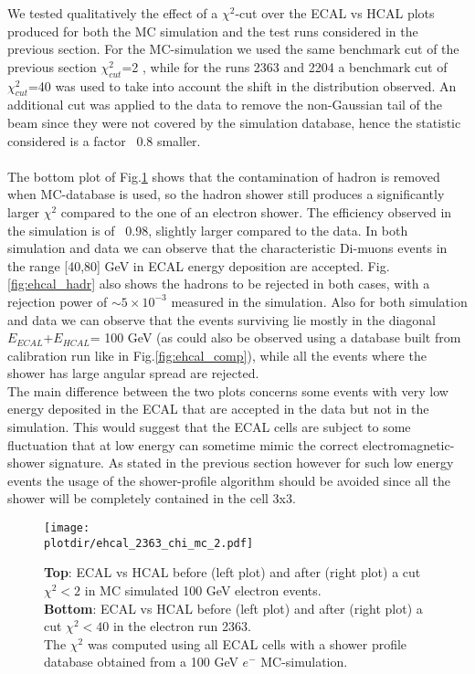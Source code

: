 We tested qualitatively the effect of a $\chi^{2}$-cut over the
ECAL vs HCAL plots produced for both the MC simulation
and the test runs considered in the previous section. For the
MC-simulation we used the same benchmark cut of the previous section
$\chi^2_{cut}$=2 , while for the runs 2363 and 2204 a benchmark cut of
$\chi^2_{cut}$=40 was used to take into account the shift in the
distribution observed. An additional cut was applied to the data to
remove the non-Gaussian tail of the beam since they were not covered
by the simulation
database, hence the statistic considered is a factor ~0.8 smaller.\\
\\
The bottom plot of Fig.\ref{fig:ehcal_elec} shows that the
contamination of hadron is removed when MC-database is used, so
the hadron shower still produces a significantly larger $\chi^{2}$
compared to the one of an electron shower. The efficiency
observed in the simulation is of ~0.98, slightly larger compared to the data. 
In both simulation and data we can observe that the characteristic
Di-muons events in the range [40,80] GeV in ECAL energy
deposition are accepted.
Fig.\ref{fig:ehcal_hadr} also shows the hadrons to be rejected in both
cases, with a rejection power of $\sim 5\times 10^{-3}$ measured in the
simulation. Also for both simulation and data we can observe that the
events surviving lie mostly in the diagonal $E_{ECAL}$+$E_{HCAL}$= 100
GeV (as could also be observed using a database built from calibration run like in Fig.\ref{fig:ehcal_comp}), while all the events where the shower has large angular spread are rejected.
\\
The main difference between the two plots concerns some events with very low energy deposited in the ECAL that are accepted in the data but not in the simulation. This would suggest that the ECAL cells are subject to some fluctuation that at low energy can sometime mimic the correct electromagnetic-shower signature. As stated in the previous section however for such low energy events the usage of the shower-profile algorithm should be avoided since all the shower will be completely contained in the cell 3x3.\\


\begin{figure}[h!]
  \begin{center}
    \texttt{[image: \\plotdir/ehcal\_2363\_chi\_mc\_2.pdf]}
  \end{center}
  \caption{\textbf{Top}: ECAL vs HCAL before (left plot) and
    after (right plot) a cut
    $\chi^2<2$ in MC simulated 100 GeV electron events. \\
    \textbf{Bottom}: ECAL vs HCAL before (left plot) and after (right
    plot) a cut
    $\chi^2<40$ in the electron run 2363.\\
    The $\chi^2$ was computed using all ECAL cells with a shower
    profile database obtained from a 100 GeV $e^-$ MC-simulation. }
  \label{fig:ehcal_elec}
\end{figure}

